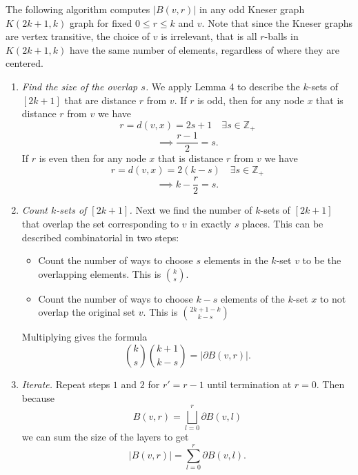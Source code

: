 \documentclass{article}
\begin{document}
The following algorithm computes $|B(v,r)|$ in any odd Kneser graph $K(2k+1,k)$ graph for fixed $0 \leq r \leq k$ and $v$. Note that since the Kneser graphs are vertex transitive, the choice of $v$ is irrelevant, that is all $r$-balls in $K(2k+1,k)$ have the same number of elements, regardless of where they are centered.

\begin{enumerate}
\item \textit{Find the size of the overlap $s$.} We apply Lemma 4 to describe the $k$-sets of $[2k+1]$ that are distance $r$ from $v$. If $r$ is odd, then for any node $x$ that is distance $r$ from $v$ we have
\[
r = d(v,x) = 2s + 1 \quad \exists s \in \mathbb{Z}_+
\]
\[
\implies \frac{r-1}{2} = s.
\]
If $r$ is even then for any node $x$ that is distance $r$ from $v$ we have
\[
r  = d(v,x) = 2(k-s) \quad \exists s \in \mathbb{Z}_+
\]
\[
\implies k - \frac{r}{2} = s.
\]

\item \textit{Count $k$-sets of $[2k+1]$.} Next we find the number of $k$-sets of $[2k+1]$ that overlap the set corresponding to $v$ in exactly $s$ places. This can be described combinatorial in two steps:
\begin{itemize}
\item Count the number of ways to choose $s$ elements in the $k$-set $v$ to be the overlapping elements. This is $\binom{k}{s}$.
\item Count the number of ways to choose $k-s$ elements of the $k$-set $x$ to not overlap the original set $v$. This is $\binom{2k+1-k}{k-s}$
\end{itemize}
Multiplying gives the formula
\[
\binom{k}{s} \binom{k+1}{k-s} = |\partial B(v,r)|.
\]

\item \textit{Iterate.} Repeat steps $1$ and $2$ for $r' = r-1$ until termination at $r = 0$. Then because
\[
B(v,r) = \bigsqcup_{l=0}^r \partial B(v,l)
\]
we can sum the size of the layers to get
\[
|B(v,r)| = \sum_{l=0}^r \partial B(v,l).
\]

\end{enumerate}

\newpage
\end{document}

